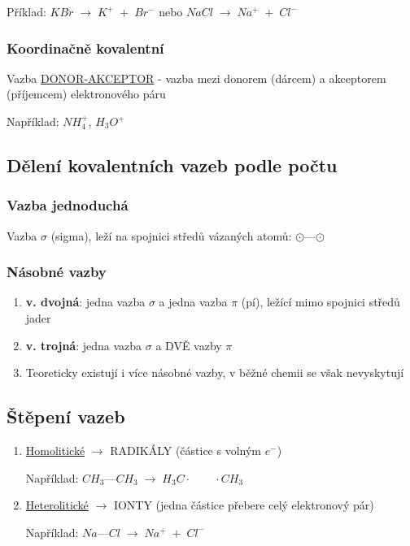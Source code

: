 Příklad: \(KBr \; \longrightarrow \; K^+ \; + \; Br^-\) nebo \(NaCl \; \longrightarrow \; Na^+ \; + \; Cl^-\)

\subsubsection{Koordinačně kovalentní}
Vazba \underline{DONOR-AKCEPTOR} - vazba mezi donorem (dárcem) a akceptorem (příjemcem) elektronového páru

\vspace{1em}
Například: $NH_4^+$, $H_3O^+$

\subsection{Dělení kovalentních vazeb podle počtu}
\subsubsection*{Vazba jednoduchá}
Vazba $\sigma$ (sigma), leží na spojnici středů vázaných atomů: $\odot$---$\odot$

\subsubsection*{Násobné vazby}
\begin{enumerate}[label=\alph*)]
    \item \textbf{v. dvojná}: jedna vazba $\sigma$ a jedna vazba $\pi$ (pí), ležící mimo spojnici středů jader
    \item \textbf{v. trojná}: jedna vazba $\sigma$ a DVĚ vazby $\pi$
    \item Teoreticky existují i více násobné vazby, v běžné chemii se však nevyskytují
\end{enumerate}

\subsection{Štěpení vazeb}
\begin{enumerate}
    \item \underline{Homolitické} $\longrightarrow$ RADIKÁLY (částice s volným $e^-$)
    
    Například: $CH_3$---$CH_3 \; \longrightarrow \; H_3C\cdot \qquad \cdot CH_3$

    \item \underline{Heterolitické} $\longrightarrow$ IONTY (jedna částice přebere celý elektronový pár)
    
    Například: $Na$---$Cl \; \longrightarrow \; Na^+ \; + \; Cl^-$

\end{enumerate}

